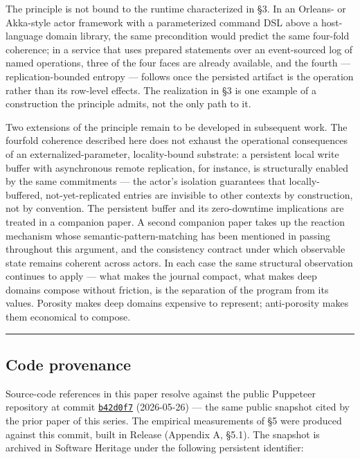 \documentclass[
]{article}
\let\origtexttt\texttt%
\renewcommand{\texttt}[1]{\origtexttt{\seqsplit{#1}}}%
\let\texttt\origtexttt%
\begin{document}
The principle is not bound to the runtime characterized in §3. In an
Orleans- or Akka-style actor framework with a parameterized command DSL
above a host-language domain library, the same precondition would
predict the same four-fold coherence; in a service that uses prepared
statements over an event-sourced log of named operations, three of the
four faces are already available, and the fourth --- replication-bounded
entropy --- follows once the persisted artifact is the operation rather
than its row-level effects. The realization in §3 is one example of a
construction the principle admits, not the only path to it.

Two extensions of the principle remain to be developed in subsequent
work. The fourfold coherence described here does not exhaust the
operational consequences of an externalized-parameter, locality-bound
substrate: a persistent local write buffer with asynchronous remote
replication, for instance, is structurally enabled by the same
commitments --- the actor's isolation guarantees that locally-buffered,
not-yet-replicated entries are invisible to other contexts by
construction, not by convention. The persistent buffer and its
zero-downtime implications are treated in a companion paper. A second
companion paper takes up the reaction mechanism whose
semantic-pattern-matching has been mentioned in passing throughout this
argument, and the consistency contract under which observable state
remains coherent across actors. In each case the same structural
observation continues to apply --- what makes the journal compact, what
makes deep domains compose without friction, is the separation of the
program from its values. Porosity makes deep domains expensive to
represent; anti-porosity makes them economical to compose.

\begin{center}\rule{0.5\linewidth}{0.5pt}\end{center}

\subsection{Code provenance}\label{code-provenance}

Source-code references in this paper resolve against the public
Puppeteer repository at commit
\href{https://github.com/alvaroNCubo/puppeteer/tree/b42d0f76b4278c36a45c221cc1453e3ee8ffb3de}{\texttt{b42d0f7}}
(2026-05-26) --- the same public snapshot cited by the prior paper of
this series. The empirical measurements of §5 were produced against this
commit, built in Release (Appendix A, §5.1). The snapshot is archived in
Software Heritage under the following persistent identifier:
\end{document}
